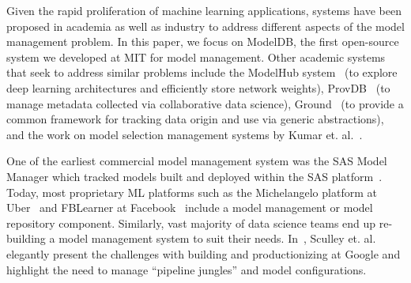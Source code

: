 \documentclass[11pt]{article}
\newcommand{\mlwfs}{ML workflows\xspace}
\newcommand{\mdb}{{\sc ModelDB}\xspace}
\newcommand{\wfs}{workflows\xspace}
\begin{document}

Given the rapid proliferation of machine learning applications, systems have been proposed in academia as well as industry to address different aspects of the model management problem.
In this paper, we focus on \mdb, the first open-source system we developed at MIT for model management.
Other academic systems that seek to address similar problems include the ModelHub system~\cite{modelhub} (to explore deep learning architectures and efficiently store network weights), 
ProvDB~\cite{provdb} (to manage 
metadata collected via collaborative data science), Ground~\cite{hellerstein2017ground} (to provide a common
framework for tracking data origin and use via generic abstractions), and the work on model selection management systems by Kumar et. al.~\cite{msms}.

One of the earliest commercial model management system was the SAS Model Manager which tracked models built and deployed within the SAS platform~\cite{sas-model-manager}.
Today, most proprietary ML platforms such as the Michelangelo platform at Uber~\cite{michelangelo} and FBLearner at Facebook~\cite{fblearner} include a model management or model repository component.
Similarly, vast majority of data science teams end up re-building a model management system to suit their needs.
In~\cite{sculley2014high-interest-cc}, Sculley et. al. elegantly present the
challenges with building and productionizing at Google and highlight the need to manage ``pipeline jungles'' and model configurations.
\end{document}
